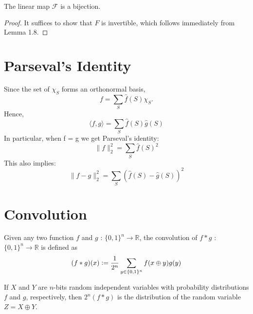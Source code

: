 \begin{theorem}
The linear map $\mathcal{F}$ is a bijection.
\end{theorem} 

\begin{proof}
It suffices to show that $F$ is invertible, which follows immediately from Lemma 1.8.
\end {proof}
\section{Parseval's Identity}
Since the set of $\chi_S$ forms an orthonormal basis, 
\begin{equation}
f = \sum \limits_{S} \widehat{f}(S) \chi_S.
\end{equation}
Hence,
\begin{equation}
\langle f, g \rangle = \sum\limits_{S} \widehat{f}(S) \widehat{g}(S)
\end{equation}
In particular, when f = g we get Parseval's identity:
\begin{equation}
\| f \|_2^2 = \sum\limits_{S} \widehat{f}(S)^2
\end{equation}
This also implies:
\begin{equation}
\| f - g \|_2^2 = \sum\limits_{S} (\widehat{f}(S) - \widehat{g}(S))^2
\end{equation}


\section{Convolution}
\begin{definition}
Given any two function $f$ and $g$ : $\{ 0,1 \}^n \rightarrow \mathbb{R}$, the convolution of $f*g$ :  $\{ 0,1 \}^n \rightarrow \mathbb{R}$ is defined as
$$(f*g)(x) \vcentcolon= \frac{1}{2^n} \sum\limits_{y \in \{0,1\}^n} f(x \oplus y) g(y)$$
\end{definition}

\begin{theorem}
If $X$ and $Y$ are $n$-bits random independent variables with probability distributions $f$ and $g$, respectively, then $2^n(f*g)$ is the distribution of the random variable $Z = X \oplus Y$.
\end{theorem}

